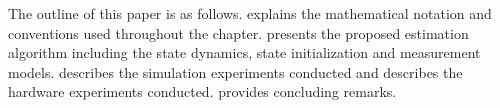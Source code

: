 
The outline of this paper is as follows.
 explains the mathematical notation and conventions used
throughout the chapter.
 presents the proposed estimation algorithm including the
state dynamics, state initialization and measurement models.
 describes the simulation experiments conducted and
 describes the hardware experiments conducted.
 provides concluding remarks.
